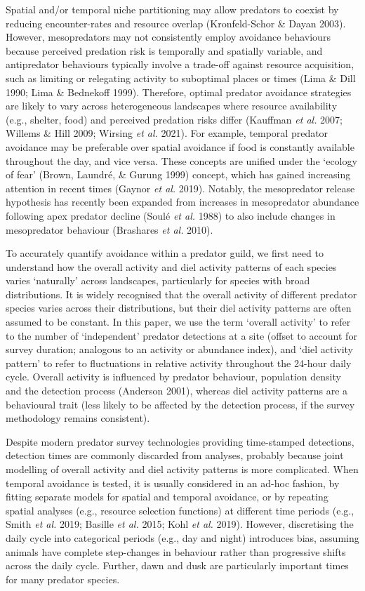 \documentclass[11pt,a4paper,titlepage,twoside,openright]{style/unimelbthesis}
\begin{document}
\begin{mainmatter}
Spatial and/or temporal niche partitioning may allow predators to coexist by reducing encounter-rates and resource overlap (Kronfeld-Schor \& Dayan 2003). However, mesopredators may not consistently employ avoidance behaviours because perceived predation risk is temporally and spatially variable, and antipredator behaviours typically involve a trade-off against resource acquisition, such as limiting or relegating activity to suboptimal places or times (Lima \& Dill 1990; Lima \& Bednekoff 1999). Therefore, optimal predator avoidance strategies are likely to vary across heterogeneous landscapes where resource availability (e.g., shelter, food) and perceived predation risks differ (Kauffman \emph{et al.} 2007; Willems \& Hill 2009; Wirsing \emph{et al.} 2021). For example, temporal predator avoidance may be preferable over spatial avoidance if food is constantly available throughout the day, and vice versa. These concepts are unified under the `ecology of fear' (Brown, Laundré, \& Gurung 1999) concept, which has gained increasing attention in recent times (Gaynor \emph{et al.} 2019). Notably, the mesopredator release hypothesis has recently been expanded from increases in mesopredator abundance following apex predator decline (Soulé \emph{et al.} 1988) to also include changes in mesopredator behaviour (Brashares \emph{et al.} 2010).

To accurately quantify avoidance within a predator guild, we first need to understand how the overall activity and diel activity patterns of each species varies `naturally' across landscapes, particularly for species with broad distributions. It is widely recognised that the overall activity of different predator species varies across their distributions, but their diel activity patterns are often assumed to be constant. In this paper, we use the term `overall activity' to refer to the number of `independent' predator detections at a site (offset to account for survey duration; analogous to an activity or abundance index), and `diel activity pattern' to refer to fluctuations in relative activity throughout the 24-hour daily cycle. Overall activity is influenced by predator behaviour, population density and the detection process (Anderson 2001), whereas diel activity patterns are a behavioural trait (less likely to be affected by the detection process, if the survey methodology remains consistent).

Despite modern predator survey technologies providing time-stamped detections, detection times are commonly discarded from analyses, probably because joint modelling of overall activity and diel activity patterns is more complicated. When temporal avoidance is tested, it is usually considered in an ad-hoc fashion, by fitting separate models for spatial and temporal avoidance, or by repeating spatial analyses (e.g., resource selection functions) at different time periods (e.g., Smith \emph{et al.} 2019; Basille \emph{et al.} 2015; Kohl \emph{et al.} 2019). However, discretising the daily cycle into categorical periods (e.g., day and night) introduces bias, assuming animals have complete step-changes in behaviour rather than progressive shifts across the daily cycle. Further, dawn and dusk are particularly important times for many predator species.


\end{mainmatter}
\end{document}
